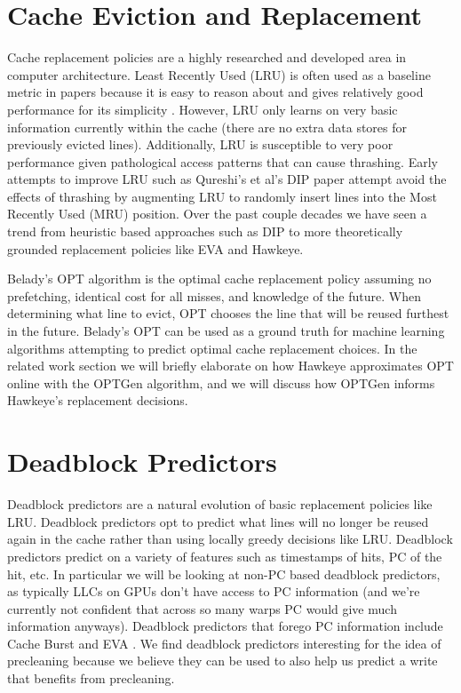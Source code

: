 \section{Cache Eviction and Replacement}
Cache replacement policies are a highly researched and developed area in computer architecture. Least Recently Used (LRU) is often used as a baseline metric in papers because it is easy to reason about and gives relatively good performance for its simplicity \cite{lruperf}. However, LRU only learns on very basic information currently within the cache (there are no extra data stores for previously evicted lines). Additionally, LRU is susceptible to very poor performance given pathological access patterns that can cause thrashing. Early attempts to improve LRU such as Qureshi’s et al’s DIP paper \cite{dip} attempt avoid the effects of thrashing by augmenting LRU to randomly insert lines into the Most Recently Used (MRU) position. Over the past couple decades we have seen a trend from heuristic based approaches such as DIP to more theoretically grounded replacement policies like EVA \cite{eva} and Hawkeye.

Belady’s OPT algorithm \cite{belady_opt} is the optimal cache replacement policy assuming no prefetching, identical cost for all misses, and knowledge of the future. When determining what line to evict, OPT chooses the line that will be reused furthest in the future. Belady’s OPT can be used as a ground truth for machine learning algorithms attempting to predict optimal cache replacement choices. In the related work section we will briefly elaborate on how Hawkeye approximates OPT online with the OPTGen algorithm, and we will discuss how OPTGen informs Hawkeye’s replacement decisions.

\section{Deadblock Predictors}
Deadblock predictors \cite{deadblock} are a natural evolution of basic replacement policies like LRU. Deadblock predictors opt to predict what lines will no longer be reused again in the cache rather than using locally greedy decisions like LRU. Deadblock predictors predict on a variety of features such as timestamps of hits, PC of the hit, etc. In particular we will be looking at non-PC based deadblock predictors, as typically LLCs on GPUs don’t have access to PC information (and we’re currently not confident that across so many warps PC would give much information anyways). Deadblock predictors that forego PC information include Cache Burst \cite{cache_burst} and EVA \cite{eva}. We find deadblock predictors interesting for the idea of precleaning because we believe they can be used to also help us predict a write that benefits from precleaning.
